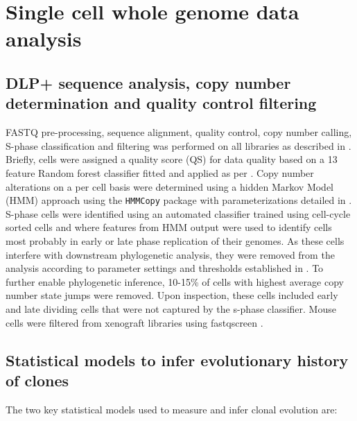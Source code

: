 \section{Single cell whole genome data analysis}
\subsection{DLP+ sequence analysis, copy number determination and quality control filtering}
FASTQ pre-processing, sequence alignment, quality control, copy number calling, S-phase classification and filtering was performed on all libraries as described in \cite{laks2019clonal}. Briefly, cells were assigned a quality score (QS) for data quality based on a 13 feature Random forest classifier fitted and applied as per \cite{laks2019clonal}. Copy number alterations on a per cell basis were determined using a hidden Markov Model (HMM) approach using the \texttt{HMMCopy} package with parameterizations detailed in \cite{laks2019clonal}. S-phase cells were identified using an automated classifier trained using cell-cycle sorted cells and where features from HMM output were used to identify cells most probably in early or late phase replication of their genomes. As these cells interfere with downstream phylogenetic analysis, they were removed from the analysis according to parameter settings and thresholds established in \cite{laks2019clonal}. To further enable phylogenetic inference, 10-15\% of cells with highest average copy number state jumps were removed. Upon inspection, these cells included early and late dividing cells that were not captured by the s-phase classifier. Mouse cells were filtered from xenograft libraries using fastqscreen \cite{wingett2018fastq}.
 
\subsection{Statistical models to infer evolutionary history of clones}
The two key statistical models used to measure and infer clonal evolution are: 
 
